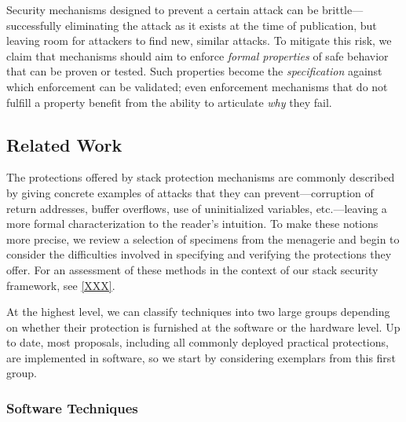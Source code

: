 Security mechanisms designed to prevent a certain attack can be brittle---successfully
eliminating the attack as it exists at the time of publication, but leaving room for attackers
to find new, similar attacks.
%
%
To mitigate this risk, we claim that mechanisms should aim to enforce \emph{formal
properties} of safe behavior that can be proven or tested. Such properties become the
\emph{specification} against which enforcement can be validated; even enforcement mechanisms that do
not fulfill a property benefit from the ability to articulate \emph{why} they fail.

%
%

\subsection{Related Work}


The protections offered by stack protection mechanisms are commonly described by giving
concrete examples of attacks that they can prevent---corruption of return
addresses, buffer overflows, use of uninitialized variables, etc.---leaving
a more formal characterization to the reader's intuition.
%
To make these notions more precise, we review a selection of specimens from the
menagerie and begin to consider the difficulties involved in specifying and
verifying the protections they offer.
%
For an assessment of these methods in the context of our stack security
framework, see \cref{XXX}.

At the highest level, we can classify techniques into two large groups depending
on whether their protection is furnished at the software or the hardware level.
Up to date, most proposals, including all commonly deployed practical
protections, are implemented in software, so we start by considering exemplars
from this first group.

\subsubsection{Software Techniques}


